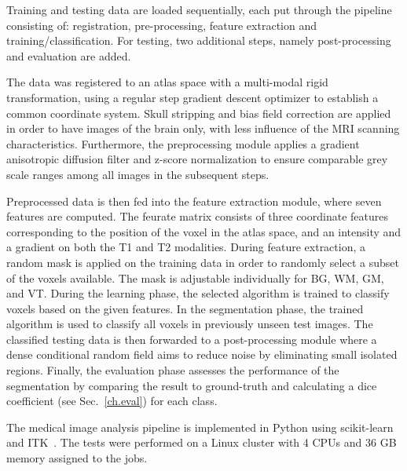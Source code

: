 \documentclass[journal]{IEEEtran}
\begin{document}
Training and testing data are loaded sequentially, each put through the pipeline consisting of: registration, pre-processing, feature extraction and training/classification. For testing, two additional steps, namely post-processing and evaluation are added.

The data was registered to an atlas space with a multi-modal rigid transformation, using a regular step gradient descent optimizer to establish a common coordinate system. Skull stripping and bias field correction are applied in order to have images of the brain only, with less influence of the MRI scanning characteristics. Furthermore, the preprocessing module applies a gradient anisotropic diffusion filter and z-score normalization to ensure comparable grey scale ranges among all images in the subsequent steps.

Preprocessed data is then fed into the feature extraction module, where seven features are computed. The feurate matrix consists of three coordinate features corresponding to the position of the voxel in the atlas space, and an intensity and a gradient on both the T1 and T2 modalities. During feature extraction, a random mask is applied on the training data in order to randomly select a subset of the voxels available. The mask is adjustable individually for BG, WM, GM, and VT. During the learning phase, the selected algorithm is trained to classify voxels based on the given features. In the segmentation phase, the trained algorithm is used to classify all voxels in previously unseen test images. The classified testing data is then forwarded to a post-processing module where a dense conditional random field \cite{krahenbuhl2011efficient} aims to reduce noise by eliminating small isolated regions. Finally, the evaluation phase assesses the performance of the segmentation by comparing the result to ground-truth and calculating a dice coefficient (see Sec.~\ref{ch.eval}) for each class.

The medical image analysis pipeline is implemented in Python using scikit-learn~\cite{pedregosa2011scikit} and ITK~\cite{yoo2002engineering}. The tests were performed on a Linux cluster with 4 CPUs and 36 GB memory assigned to the jobs.
\end{document}
